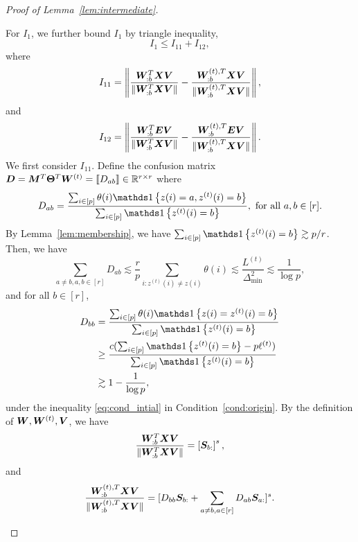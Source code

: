 \documentclass[journal]{IEEEtran}
\theoremstyle{definition}
\theoremstyle{definition}
\newcommand{\off}[1]{\left[#1\right]}
\newcommand{\offf}[1]{\left\{#1\right\}}
\begin{document}
\begin{proof}[Proof of Lemma~\ref{lem:intermediate}]
\begin{enumerate}[wide]
    For $I_1$, we further bound $I_1$ by triangle inequality,
    \begin{equation}
        I_1 \leq I_{11} + I_{12},
    \end{equation}
    where
 \begin{equation}
        I_{11} = \left\lVert \frac{ \bm{W}_{:b}^T \bm X \bm{V}  }{\lVert  \bm{W}_{:b}^T \bm X \bm{V} \rVert} - \frac{ \bm{W}_{:b}^{(t), T} \bm X \bm{V}  }{ \lVert\bm{W}_{:b}^{(t), T} \bm X \bm{V} \rVert}   \right\rVert,
    \end{equation}
    and 
    \begin{equation}
        I_{12} = \left\lVert \frac{\bm{W}_{:b}^T \bm{E} \bm{V}}{ \lVert  \bm{W}_{:b}^T \bm X \bm{V} \rVert} - \frac{\bm{W}_{:b}^{(t),T} \bm{E} \bm{V}}{ \lVert  \bm{W}_{:b}^{(t),T} \bm X \bm{V} \rVert} \right\rVert.
    \end{equation}
    We first consider $I_{11}$. Define the confusion matrix $\bm{D} = \bm M^T \boldsymbol{\Theta}^T \bm{W}^{(t)} = \llbracket D_{ab} \rrbracket \in \mathbb{R}^{r \times r}$ where 
    \begin{equation}
        D_{ab} = \frac{\sum_{i \in [p]}  \theta(i) \ind \offf{ z(i) = a, z^{(t)}(i) = b } }{\sum_{i \in [p]}  \ind\offf{  z^{(t)}(i) = b }}, \text{  for all } a, b \in [r].
    \end{equation}
    By Lemma~\ref{lem:membership},  we have $\sum_{i \in [p]}  \ind\offf{  z^{(t)}(i) = b } \gtrsim p/r$. Then, we have
    \small
    \begin{equation}\label{eq:dab_bound}
        \sum_{a \neq b, a,b \in [r]} D_{ab} \lesssim \frac{r}{p} \sum_{i \colon z^{(t)}(i) \neq z(i)} \theta(i) \lesssim\frac{L^{(t)}}{\Delta_{\min}^2}  \lesssim \frac{1}{\log p}, 
    \end{equation}
    \normalsize
    and for all $b \in [r]$,
    \begin{align}
        D_{bb} &= \frac{\sum_{i \in [p]}  \theta(i) \ind \offf{ z(i) = z^{(t)}(i) = b } }{\sum_{i \in [p]}  \ind\offf{  z^{(t)}(i) = b }} \\
        &\geq \frac{c(\sum_{i \in [p]}  \ind\offf{  z^{(t)}(i) = b } - p\ell^{(t)})}{\sum_{i \in [p]}  \ind\offf{  z^{(t)}(i) = b }} \\
        &\gtrsim 1 - \frac{1}{\log p},\label{eq:dbb_bound}
    \end{align}
    under the inequality \eqref{eq:cond_intial} in Condition~\ref{cond:origin}. By the definition of $\bm{W},\bm{W}^{(t)},\bm{V}$, we have 
    \begin{align}
        \frac{ \mW_{:b}^T \mX \mV  }{\onormSize{}{  \mW_{:b}^T \mX \mV }} = \off{\mS_{b:}}^s,
    \end{align}
    and 
    \begin{equation}
        \frac{ \bm{W}_{:b}^{(t), T} \bm X \bm{V}  }{ \lVert\bm{W}_{:b}^{(t), T} \bm X \bm{V} \rVert} = [D_{bb} \bm S_{b:} + \sum_{a \neq b, a \in [r]} D_{ab} \bm S_{a:}]^s.
    \end{equation}


\end{enumerate}
\end{proof}
\end{document}
